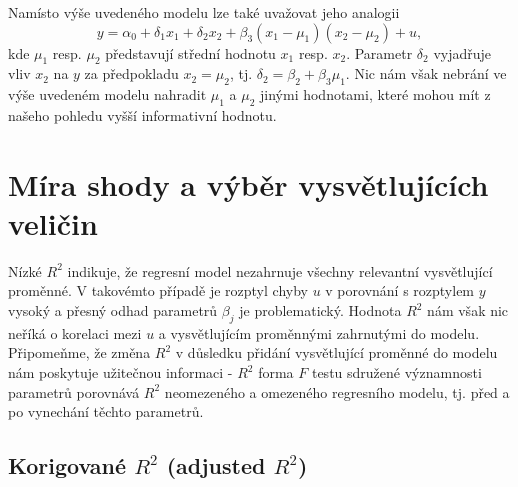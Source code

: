 Namísto výše uvedeného modelu lze také uvažovat jeho analogii
\begin{equation}
y = \alpha_0 + \delta_1 x_1 + \delta_2 x_2 + \beta_3(x_1 - \mu_1)(x_2 - \mu_2) + u,
\end{equation}
kde $\mu_1$ resp. $\mu_2$ představují střední hodnotu $x_1$ resp. $x_2$. Parametr $\delta_2$ vyjadřuje vliv $x_2$ na $y$ za předpokladu $x_2 = 
\mu_2$, tj. $\delta_2 = \beta_2 + \beta_3 \mu_1$. Nic nám však nebrání ve výše uvedeném modelu nahradit $\mu_1$ a $\mu_2$ jinými hodnotami, které 
mohou mít z našeho pohledu vyšší informativní hodnotu.

\section{Míra shody a výběr vysvětlujících veličin}

Nízké $R^2$ indikuje, že regresní model nezahrnuje všechny relevantní vysvětlující proměnné. V takovémto případě je rozptyl chyby $u$ v porovnání s rozptylem 
$y$ vysoký a přesný odhad parametrů $\beta_j$ je problematický. Hodnota $R^2$ nám však nic neříká o korelaci mezi $u$ a vysvětlujícím 
proměnnými zahrnutými do modelu. Připomeňme, že změna $R^2$ v důsledku přidání vysvětlující proměnné do modelu nám poskytuje 
užitečnou informaci - $R^2$ forma $F$ testu sdružené významnosti parametrů porovnává $R^2$ neomezeného a omezeného regresního modelu, tj. 
před a po vynechání těchto parametrů.

\subsection{Korigované $R^2$ (adjusted $R^2$)}

